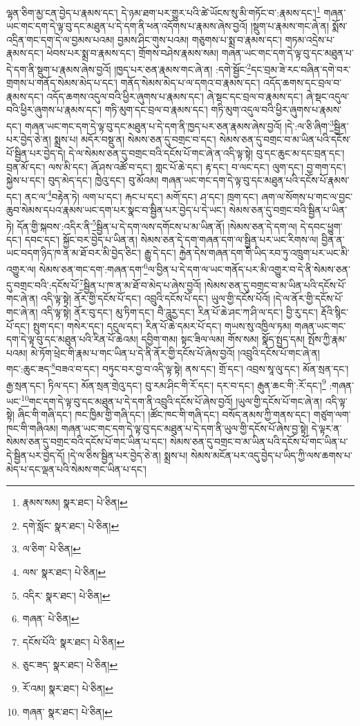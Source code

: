 ལྷན་ཅིག་མྱ་ངན་བྱེད་པ་རྣམས་དང་། དེ་ཉམ་ཐག་པར་གྱུར་པའི་ཚེ་ཡོངས་སུ་མི་གཏོང་བ་:རྣམས་དང་།\footnote{རྣམས་སམ།  སྣར་ཐང་།  པེ་ཅིན། } གཞན་ཡང་གང་དག་དེ་ལྟ་བུ་དང་མཐུན་པ་དེ་དག་ནི་ཕན་འདོགས་པ་རྣམས་ཞེས་བྱའོ། །སྡུག་པ་རྣམས་གང་ཞེ་ན། སྨོས་འདྲིན་གང་དག་དེ་ལ་བྱམས་པའམ། བྱམས་ཤིང་གུས་པའམ། གཅུགས་པ་སྨྲ་བ་རྣམས་དང་། གཏམ་འདྲེས་པ་རྣམས་དང་། ཕེབས་པར་སྨྲ་བ་རྣམས་དང་། གྲོགས་བཤེས་རྣམས་སམ། གཞན་ཡང་གང་དག་དེ་ལྟ་བུ་དང་མཐུན་པ་དེ་དག་ནི་སྡུག་པ་རྣམས་ཞེས་བྱའོ། །ཁྱད་པར་ཅན་རྣམས་གང་ཞེ་ན། :དགེ་སྦྱོང་\footnote{དགེ་སློང་  སྣར་ཐང་།  པེ་ཅིན། }དང་བྲམ་ཟེ་རང་བཞིན་དགེ་བར་གྲགས་པ་གནོད་སེམས་མེད་པ་དང་། གནོད་སེམས་མེད་པ་ལ་དགའ་བ་རྣམས་དང་། འདོད་ཆགས་དང་བྲལ་བ་རྣམས་དང་། འདོད་ཆགས་འདུལ་བའི་ཕྱིར་ཞུགས་པ་རྣམས་དང་། ཞེ་སྡང་དང་བྲལ་བ་རྣམས་དང་། ཞེ་སྡང་འདུལ་བའི་ཕྱིར་ཞུགས་པ་རྣམས་དང་། གཏི་མུག་དང་བྲལ་བ་རྣམས་དང་། གཏི་མུག་འདུལ་བའི་ཕྱིར་ཞུགས་པ་རྣམས་དང་། གཞན་ཡང་གང་དག་དེ་ལྟ་བུ་དང་མཐུན་པ་དེ་དག་ནི་ཁྱད་པར་ཅན་རྣམས་ཞེས་བྱའོ། །དེ་:ལ་ཅི་ཞིག་\footnote{ལ་ཅིག་  པེ་ཅིན། }སྦྱིན་པར་བྱེད་ཅེ་ན། སྨྲས་པ། མདོར་བསྡུ་ན། སེམས་ཅན་དུ་བགྲང་བ་དང་། སེམས་ཅན་དུ་བགྲང་བ་མ་ཡིན་པའི་དངོས་པོ་སྦྱིན་པར་བྱེད་དེ། དེ་ལ་སེམས་ཅན་དུ་བགྲང་བའི་དངོས་པོ་གང་ཞེ་ན་འདི་ལྟ་སྟེ། བུ་དང་ཆུང་མ་དང་བྲན་དང་། བྲན་མོ་དང་། ལས་མི་དང་། ཞོ་ཤས་འཚོ་བ་དང་། གླང་པོ་ཆེ་དང་། རྟ་དང་། བ་ལང་དང་། ལུག་དང་། བྱ་གག་དང་། སྐྱེས་པ་དང་། བུད་མེད་དང་། ཁྱེའུ་དང་། བུ་མོའམ། གཞན་ཡང་གང་དག་དེ་ལྟ་བུ་དང་མཐུན་པའི་དངོས་པོ་རྣམས་དང་། ནང་ལ་\footnote{ལས་  སྣར་ཐང་།  པེ་ཅིན། }བརྟེན་ཏེ། ལག་པ་དང་། རྐང་པ་དང་། མགོ་དང་། ཤ་དང་། ཁྲག་དང་། ཞག་ལ་སོགས་པ་གང་ལ་བྱང་ཆུབ་སེམས་དཔའ་རྣམས་ཡང་དག་པར་སྣང་བ་སྦྱིན་པར་བྱེད་པ་དེ་ཡང་། སེམས་ཅན་དུ་བགྲང་བའི་སྦྱིན་པ་ཡིན་ཏེ། དོན་གྱི་སྐབས་:འདིར་ནི་\footnote{འདིར་  སྣར་ཐང་།  པེ་ཅིན། }སྦྱིན་པ་དེ་དག་ལས་དགོངས་པ་མ་ཡིན་ནོ། །སེམས་ཅན་དེ་དག་ལ། དེ་དབང་ཕྱུག་དང་། དབང་དང་། སྐྱོང་བར་བྱེད་པ་ཡིན་ན། སེམས་ཅན་དེ་དག་གཞན་དག་ལ་སྦྱིན་པར་ཡང་རིགས་ལ། བྱིན་ན་ཡང་བདག་ཉིད་ཁ་ན་མ་ཐོ་བར་མི་བྱེད་ཅིང་། རྒྱུ་དེ་དང་། རྐྱེན་དེས་གཞན་དག་གི་ཡིད་རབ་ཏུ་འཁྲུག་པར་ཡང་མི་འགྱུར་ལ། སེམས་ཅན་གང་དག་:གཞན་དག་\footnote{གཞན་  པེ་ཅིན། }ལ་བྱིན་པ་དེ་དག་ལ་ཡང་གནོད་པར་མི་འགྱུར་བ་དེ་ནི་སེམས་ཅན་དུ་བགྲང་བའི་:དངོས་པོ་\footnote{དངོས་པོའི་  སྣར་ཐང་།  པེ་ཅིན། }སྦྱིན་པ་ཁ་ན་མ་ཐོ་བ་མེད་པ་ཞེས་བྱའོ། །སེམས་ཅན་དུ་བགྲང་བ་མ་ཡིན་པའི་དངོས་པོ་གང་ཞེ་ན། འདི་ལྟ་སྟེ། ནོར་གྱི་དངོས་པོ་དང་། འབྲུའི་དངོས་པོ་དང་། ཡུལ་གྱི་དངོས་པོའོ། །དེ་ལ་ནོར་གྱི་དངོས་པོ་གང་ཞེ་ན། འདི་ལྟ་སྟེ། ནོར་བུ་དང་། མུ་ཏིག་དང་། བཻ་ཌཱུརྱ་དང་། རིན་པོ་ཆེ་ཤང་ཀ་ཤི་ལ་དང་། བྱི་རུ་དང་། རྡོའི་སྙིང་པོ་དང་། སྤུག་དང་། གསེར་དང་། དངུལ་དང་། རིན་པོ་ཆེ་དམར་པོ་དང་། གཡས་སུ་འཁྱིལ་ཏམ། གཞན་ཡང་གང་དག་དེ་ལྟ་བུ་དང་མཐུན་པའི་རིན་པོ་ཆེའམ། དབྱིག་གམ། སྟང་ཟིལ་ལམ། གོས་སམ། སྣོད་སྤྱད་དམ། སྤོས་ཀྱི་རྣམ་པའམ། མེ་ཏོག་ཕྲེང་གི་རྣམ་པ་གང་ཡིན་པ་དེ་ནི་ནོར་གྱི་དངོས་པོ་ཞེས་བྱའོ། །འབྲུའི་དངོས་པོ་གང་ཞེ་ན། གང་:ཆུང་ཟད་\footnote{ཅུང་ཟད་  སྣར་ཐང་།  པེ་ཅིན། }བཟའ་བ་དང་། བཏུང་བར་བྱ་བ་འདི་ལྟ་སྟེ། ནས་དང་། གྲོ་དང་། འབྲས་སཱ་ལུ་དང་། མོན་སྲན་དང་། རྒྱ་སྲན་དང་། ཏིལ་དང་། མོན་སྲན་གྲེའུ་དང་། བུ་རམ་ཤིང་གི་རོ་དང་། དར་བ་དང་། རྒུན་ཆང་གི་:རོ་དང་།\footnote{རོ་འམ།  སྣར་ཐང་།  པེ་ཅིན། } :གཞན་ཡང་\footnote{གཞན་  སྣར་ཐང་།  པེ་ཅིན། }གང་དག་དེ་ལྟ་བུ་དང་མཐུན་པ་དེ་དག་ནི་འབྲུའི་དངོས་པོ་ཞེས་བྱའོ། །ཡུལ་གྱི་དངོས་པོ་གང་ཞེ་ན། འདི་ལྟ་སྟེ། ཞིང་གི་གཞི་དང་། ཁང་ཁྱིམ་གྱི་གཞི་དང་། །ཚོང་ཁང་གི་གཞི་དང་། བསོད་ནམས་ཀྱི་གནས་དང་། གཙུག་ལག་ཁང་གི་གཞིའམ། གཞན་ཡང་གང་དག་དེ་ལྟ་བུ་དང་མཐུན་པ་དེ་དག་ནི་ཡུལ་གྱི་དངོས་པོ་ཞེས་བྱ་སྟེ། དེ་ལྟར་ན་སེམས་ཅན་དུ་བགྲང་བའི་དངོས་པོ་གང་ཡིན་པ་དང་། སེམས་ཅན་དུ་བགྲང་བ་མ་ཡིན་པའི་དངོས་པོ་གང་ཡིན་པ་དེ་སྦྱིན་པར་བྱེད་དོ། །དེ་ལ་ཅིས་སྦྱིན་པར་བྱེད་ཅེ་ན། སྨྲས་པ། སེམས་མངོན་པར་འདུ་བྱེད་པ་ཡིད་ཀྱི་ལས་ཆགས་པ་མེད་པ་དང་ལྡན་པའི་སེམས་གང་ཡིན་པ་དང་། 